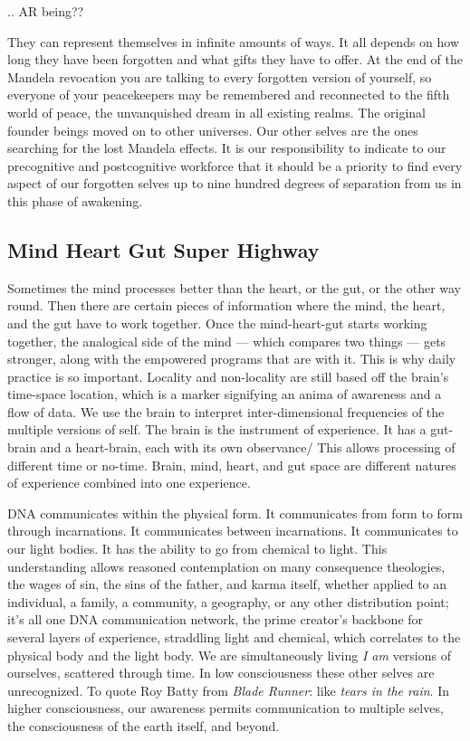 .. AR being??

They can represent themselves in infinite amounts of ways. It all
depends on how long they have been forgotten and what gifts they have to
offer. At the end of the Mandela revocation you are talking to every
forgotten version of yourself, so everyone of your peacekeepers may be
remembered and reconnected to the fifth world of peace, the unvanquished
dream in all existing realms. The original founder beings moved on to
other universes. Our other selves are the ones searching for the lost
Mandela effects. It is our responsibility to indicate to our
precognitive and postcognitive workforce that it should be a priority to
find every aspect of our forgotten selves up to nine hundred degrees of
separation from us in this phase of awakening.

\subsection{Mind Heart Gut Super
Highway}\label{mind-heart-gut-super-highway}

Sometimes the mind processes better than the heart, or the gut, or the
other way round. Then there are certain pieces of information where the
mind, the heart, and the gut have to work together. Once the
mind-heart-gut starts working together, the analogical side of the mind
--- which compares two things --- gets stronger, along with the
empowered programs that are with it. This is why daily practice is so
important. Locality and non-locality are still based off the brain's
time-space location, which is a marker signifying an anima of awareness
and a flow of data. We use the brain to interpret inter-dimensional
frequencies of the multiple versions of self. The brain is the
instrument of experience. It has a gut-brain and a heart-brain, each
with its own observance/ This allows processing of different time or
no-time. Brain, mind, heart, and gut space are different natures of
experience combined into one experience.

DNA communicates within the physical form. It communicates from form to
form through incarnations. It communicates between incarnations. It
communicates to our light bodies. It has the ability to go from chemical
to light. This understanding allows reasoned contemplation on many
consequence theologies, the wages of sin, the sins of the father, and
karma itself, whether applied to an individual, a family, a community, a
geography, or any other distribution point; it's all one DNA
communication network, the prime creator's backbone for several layers
of experience, straddling light and chemical, which correlates to the
physical body and the light body. We are simultaneously living \emph{I
am} versions of ourselves, scattered through time. In low consciousness
these other selves are unrecognized. To quote Roy Batty from \emph{Blade
Runner}: like \emph{tears in the rain}. In higher consciousness, our
awareness permits communication to multiple selves, the consciousness of
the earth itself, and beyond.


